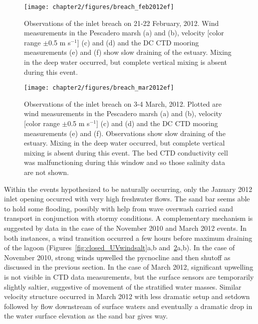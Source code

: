 \begin{figure}[h]
	\centering
	\texttt{[image: chapter2/figures/breach\_feb2012ef]} 
	\caption{Observations of the inlet breach on 21-22 February, 2012. Wind measurements in the Pescadero marsh (a) and (b), velocity [color range $\pm$0.5 m s$^{-1}$] (c) and (d) and the DC CTD mooring measurements (e) and (f) show slow draining of the estuary. Mixing in the deep water occurred, but complete vertical mixing is absent during this event.} \label{fig:breach_feb2012}
\end{figure}


\begin{figure}[h]
	\centering
	\texttt{[image: chapter2/figures/breach\_mar2012ef]} 
	\caption{Observations of the inlet breach on 3-4 March, 2012. Plotted are wind measurements in the Pescadero marsh (a) and (b), velocity [color range $\pm$0.5 m s$^{-1}$] (c) and (d) and the DC CTD mooring measurements (e) and (f). Observations show slow draining of the estuary. Mixing in the deep water occurred, but complete vertical mixing is absent during this event. The bed CTD conductivity cell was malfunctioning during this window and so those salinity data are not shown.} \label{fig:breach_mar2012}
\end{figure}


Within the events hypothesized to be naturally occurring, only the January 2012 inlet opening occurred with very high freshwater flows. The sand bar seems able to hold some flooding, possibly with help from wave overwash carried sand transport in conjunction with stormy conditions.  A complementary mechanism is suggested by data in the case of the November 2010 and March 2012 events. In both instances, a wind transition occurred a few hours before maximum draining of the lagoon (Figures~\ref{fig:closed_UVwindsalt}a,b and~\ref{fig:breach_mar2012}a,b). In the case of November 2010, strong winds upwelled the pycnocline and then shutoff as discussed in the previous section. In the case of March 2012, significant upwelling is not visible in CTD data measurements, but the surface sensors are temporarily slightly saltier, suggestive of movement of the stratified water masses. Similar velocity structure occurred in March 2012 with less dramatic setup and setdown followed by flow downstream of surface waters and eventually a dramatic drop in the water surface elevation as the sand bar gives way. 

